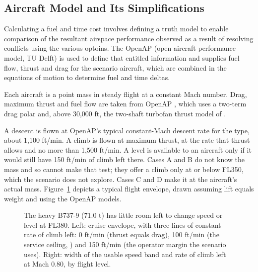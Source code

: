 \subsection{Aircraft Model and Its Simplifications}
\label{sec:scoring-limits}
Calculating a fuel and time cost involves defining a truth model to enable comparison of the resultant airspace performance observed as a result of resolving conflicts using the various optoins. The OpenAP (open aircraft performance model, TU Delft) is used to define that entitled information and supplies fuel flow, thrust and drag for the scenario aircraft, which are combined in the equations of motion to determine fuel and time deltas.

Each aircraft is a point mass in steady flight at a constant Mach number. Drag, maximum thrust and fuel flow are taken from OpenAP \cite{sun2020openap}, which uses a two-term drag polar and, above 30,000 ft, the two-shaft turbofan thrust model of \textcite{bartel2008thrustFuel}. 


A descent is flown at OpenAP's typical constant-Mach descent rate for the type, about 1,100 ft/min. A climb is flown at maximum thrust, at the rate that thrust allows and no more than 1,500 ft/min. A level is available to an aircraft only if it would still have 150 ft/min of climb left there. Cases A and B do not know the mass and so cannot make that test; they offer a climb only at or below FL350, which the scenario does not explore. Cases C and D make it at the aircraft's actual mass. Figure~\ref{fig:envelope} depicts a typical flight envelope, drawn assuming lift equals weight and using the OpenAP models. 

\begin{figure}[htbp]
\centering
{}
\caption{The heavy B737-9 (71.0 t) has little room left to change speed or level at FL380. Left: cruise envelope, with three lines of constant rate of climb left: 0 ft/min (thrust equals drag), 100 ft/min (the service ceiling, \cite{faa2015ac61107b}) and 150 ft/min (the operator margin the scenario uses). Right: width of the usable speed band and rate of climb left at Mach 0.80, by flight level.}
\label{fig:envelope}
\end{figure}

